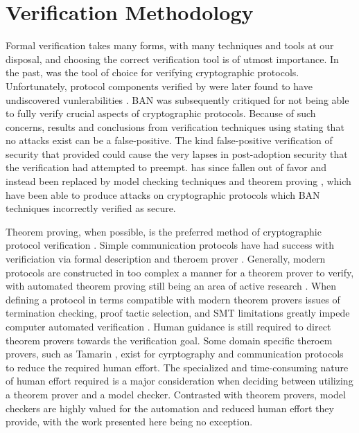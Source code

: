 \hypertarget{sec:methodology}{%
\chapter{Verification Methodology}\label{sec:methodology}}

Formal verification takes many forms, with many techniques and tools at our disposal, and choosing the correct verification tool is of utmost importance.
In the past,  \autocite{burrows1989logic} was the tool of choice for verifying cryptographic protocols.
Unfortunately, protocol components verified by  were later found to have undiscovered vunlerabilities \autocite{snekkenes1991exploring}.
BAN was subsequently critiqued \autocite{boyd1993limitation} for not being able to fully verify crucial aspects of cryptographic protocols.
Because of such concerns, results and conclusions from verification techniques using  stating that no attacks exist can be a false-positive.
The kind false-positive verification of security that  provided could cause the very lapses in post-adoption security that the verification had attempted to preempt.
 has since fallen out of favor and instead been replaced by model checking techniques \autocite{holzmann1991design} and theorem proving \autocite{andrews1980axiomatic}, which have been able to produce attacks on cryptographic protocols which BAN techniques incorrectly verified as secure.

Theorem proving, when possible, is the preferred method of cryptographic protocol verification \autocite{kobeissi2020verifpal}.
Simple communication protocols have had success with verificiation via formal description and theroem prover \autocite{berry1987towards, cheng1990formal}.
Generally, modern protocols are constructed in too complex a manner for a theorem prover to verify, with automated theorem proving still being an area of active research \autocite{xiong2020smartverif, bhargavan2021text}.
When defining a protocol in terms compatible with modern theorem provers issues of termination checking, proof tactic selection, and SMT limitations greatly impede computer automated verification \autocite{hassan2021automated}.
Human guidance is still required to direct theorem provers towards the verification goal.
Some domain specific theroem provers, such as Tamarin \autocite{basin2017symbolically}, exist for cyrptography and communication protocols to reduce the required human effort.
The specialized and time-consuming nature of human effort required is a major consideration when deciding between utilizing a theorem prover and a model checker.
Contrasted with theorem provers, model checkers are highly valued for the automation and reduced human effort they provide, with the work presented here being no exception.

